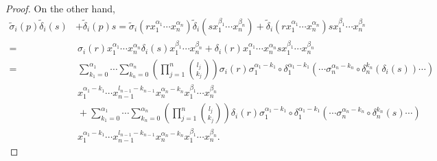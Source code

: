 \documentclass{amsart}
\theoremstyle{definition}
\theoremstyle{remark}
\numberwithin{equation}{section}
\begin{document}
\begin{proof}
On the other hand,
{\footnotesize{
    \begin{align*}
    \widetilde{\sigma}_i(p)\widetilde{\delta}_i(s) & + \widetilde{\delta}_i(p)s = \widetilde{\sigma}_i(rx_1^{\alpha_{1}}\cdots x_n^{\alpha_{n}})\widetilde{\delta}_i(sx_1^{\beta_{1}}\cdots x_n^{\beta_{n}})+\widetilde{\delta}_i(rx_1^{\alpha_{1}}\cdots x_n^{\alpha_{n}})sx_1^{\beta_{1}}\cdots x_n^{\beta_{n}} \\
    = &\ \sigma_i(r)x_1^{\alpha_{1}}\cdots x_n^{\alpha_{n}}\delta_i(s)x_1^{\beta_{1}}\cdots x_n^{\beta_{n}}+\delta_i(r)x_1^{\alpha_{1}}\cdots x_n^{\alpha_{n}}sx_1^{\beta_{1}}\cdots x_n^{\beta_{n}} \\
    = &\ \sum_{k_1=0}^{\alpha_{1}}\cdots\sum_{k_n=0}^{\alpha_{n}}\left(\prod_{j=1}^{n}\binom{l_j}{k_j}\right)\sigma_i(r)\sigma_1^{\alpha_{1}-k_1}\circ \delta_1^{\alpha_{1}-k_1}\left(\cdots\sigma_{n}^{\alpha_{n}-k_n}\circ\delta_n^{k_n}(\delta_i(s))\cdots\right) \\
    &\ x_1^{\alpha_{1}-k_1}\cdots x_{n-1}^{l_{n-1}-k_{n-1}}x_n^{\alpha_{n}-k_n}x_1^{\beta_{1}}\cdots x_n^{\beta_{n}} \\
    &\ + \sum_{k_1=0}^{\alpha_{1}}\cdots\sum_{k_n=0}^{\alpha_{n}}\left(\prod_{j=1}^{n}\binom{l_j}{k_j}\right)\delta_i(r)\sigma_1^{\alpha_{1}-k_1}\circ \delta_1^{\alpha_{1}-k_1}\left(\cdots\sigma_{n}^{\alpha_{n}-k_n}\circ\delta_n^{k_n}(s)\cdots\right) \\
    &\ x_1^{\alpha_{1}-k_1}\cdots x_{n-1}^{l_{n-1}-k_{n-1}}x_n^{\alpha_{n}-k_n}x_1^{\beta_{1}}\cdots x_n^{\beta_{n}}.
    \end{align*}
}}


\end{proof}
\end{document}
